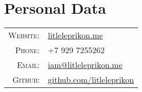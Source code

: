 \documentclass[a4paper,10pt]{article}
\begin{document}
\par{\bigskip\par}


\section{Personal Data}

\begin{tabular}{r p{11cm}}
    \textsc{Website:}  &  \href{https://litleleprikon.me/}{litleleprikon.me}\\
    \textsc{Phone:}    &  +7 929 7255262\\
    \textsc{Email:}    &  \href{mailto:iam@litleleprikon.me}{iam@litleleprikon.me} \\
    \textsc{Github:}   &  \href{https://github.com/litleleprikon}{github.com/litleleprikon}
\end{tabular}
\end{document}
